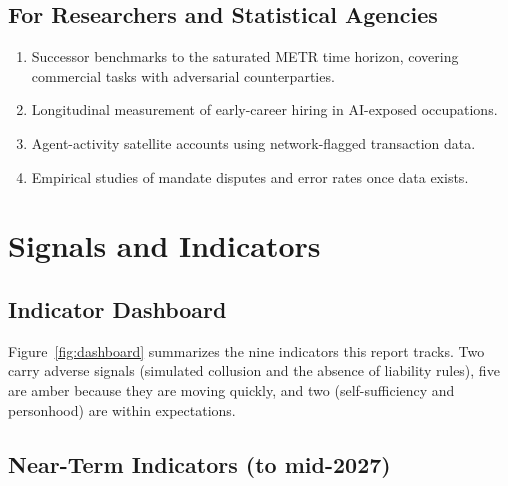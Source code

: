 \documentclass[11pt,letterpaper]{article}
\begin{document}
\subsection{For Researchers and Statistical Agencies}

\begin{enumerate}
  \item Successor benchmarks to the saturated METR time horizon, covering commercial tasks with adversarial counterparties.
  \item Longitudinal measurement of early-career hiring in AI-exposed occupations.
  \item Agent-activity satellite accounts using network-flagged transaction data.
  \item Empirical studies of mandate disputes and error rates once data exists.
\end{enumerate}

\section{Signals and Indicators}
\label{sec:signals}

\subsection{Indicator Dashboard}

Figure~\ref{fig:dashboard} summarizes the nine indicators this report tracks. Two carry adverse signals (simulated collusion and the absence of liability rules), five are amber because they are moving quickly, and two (self-sufficiency and personhood) are within expectations.

\subsection{Near-Term Indicators (to mid-2027)}
\end{document}

